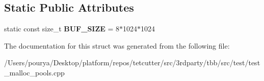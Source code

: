 \subsection*{Static Public Attributes}
\begin{DoxyCompactItemize}
\item 
\hypertarget{structPoolSpace_a539b565bc6533f60810c7b530205fd22}{}static const size\+\_\+t {\bfseries B\+U\+F\+\_\+\+S\+I\+Z\+E} = 8$\ast$1024$\ast$1024\label{structPoolSpace_a539b565bc6533f60810c7b530205fd22}

\end{DoxyCompactItemize}


The documentation for this struct was generated from the following file\+:\begin{DoxyCompactItemize}
\item 
/\+Users/pourya/\+Desktop/platform/repos/tetcutter/src/3rdparty/tbb/src/test/test\+\_\+malloc\+\_\+pools.\+cpp\end{DoxyCompactItemize}
